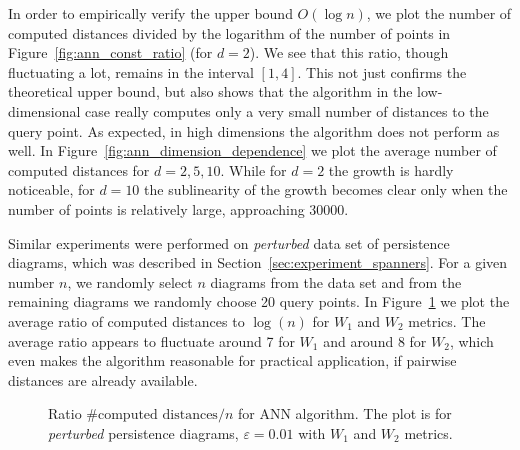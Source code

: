 \documentclass[]{ws-ijcga}
\newcommand{\eps}{\varepsilon}
\newcommand{\dtype}[1]{{\textit{\small #1}}}
\newcommand{\wsdist}[1]{{W_{#1}}}
\def \expDistDataPath {./}
\begin{document}
In order to empirically verify the upper bound $O(\log n)$,
we plot the number of computed distances divided
by the logarithm of the number of points in Figure~\ref{fig:ann_const_ratio} (for $d = 2$).
We see that this ratio, though fluctuating a lot, remains in the interval $[1,4]$. This not just confirms
the theoretical upper bound, but also shows that the algorithm in the low-dimensional case
really computes only a very small number of distances to the query point.
As expected, in high dimensions the algorithm does not perform as well.
In Figure~\ref{fig:ann_dimension_dependence} we plot the average number of computed distances
for $d = 2, 5, 10$. While for $d = 2$ the growth is hardly noticeable, for $d = 10$
the sublinearity of the growth becomes clear only when the number of points is relatively large,
approaching 30000.



Similar experiments were performed on \dtype{perturbed} data set of persistence
diagrams, which was described in Section~\ref{sec:experiment_spanners}.
For a given number $n$, we randomly select $n$ diagrams from the data set
and from the remaining diagrams we randomly choose 20 query points.
In Figure~\ref{fig:ann_const_ratio_mcgill} we plot the average ratio of computed
distances to $\log(n)$ for $\wsdist{1}$ and $\wsdist{2}$ metrics.
The average ratio appears to fluctuate around 7 for $\wsdist{1}$ and around 8 for $\wsdist{2}$,
which even makes the algorithm
reasonable for practical application, if pairwise distances are already available.

\begin{figure}[!htbp]
    \begin{centering}
\end{centering}
    \caption{ Ratio $\mbox{\# computed distances} / n$ for ANN algorithm. The plot is for \dtype{perturbed} persistence diagrams,
    $\eps = 0.01$ with $\wsdist{1}$ and $\wsdist{2}$ metrics.}
    \label{fig:ann_const_ratio_mcgill}
\end{figure}
\end{document}
